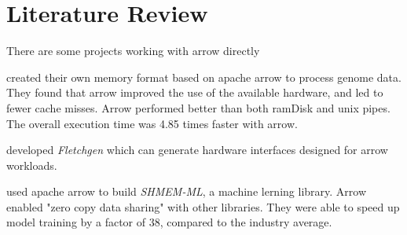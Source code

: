 \chapter{Literature Review}
\label{chapter:Literature}

There are some projects working with arrow directly

\textcite{Ahmad2020}
created their own memory format based on apache arrow to process genome data.
They found that arrow improved the use of the available hardware, and led to fewer cache misses.
Arrow performed better than both ramDisk and unix pipes.
The overall execution time was 4.85 times faster with arrow.


\textcite{Peltenburg2021}
developed \emph{Fletchgen} which can generate hardware interfaces designed for arrow workloads.



\textcite{Grossman2022}
used apache arrow to build \emph{SHMEM-ML}, a machine lerning library.
Arrow enabled "zero copy data sharing" with other libraries.
They were able to speed up model training by a factor of 38, compared to the industry average.



